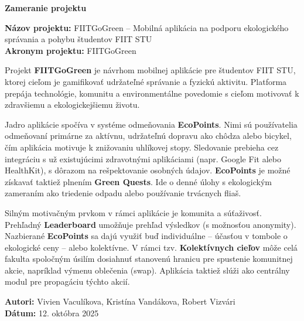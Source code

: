 \documentclass[12pt,a4paper]{article}
\begin{document}
\begin{center}
	\vspace*{1cm}
	{\LARGE \textbf{Zameranie projektu}}\\[0.5cm]


	\begin{flushleft}
		\textbf{Názov projektu:} FIITGoGreen – Mobilná aplikácia na podporu ekologického správania a pohybu študentov FIIT STU \\
		\textbf{Akronym projektu:} FIITGoGreen
	\end{flushleft}
\end{center}

\vspace{0.5cm}

Projekt \textbf{FIITGoGreen} je návrhom mobilnej aplikácie pre študentov FIIT STU, ktorej cieľom je gamifikovať udržateľné správanie a fyzickú aktivitu. Platforma prepája technológie, komunitu a environmentálne povedomie s cieľom motivovať k zdravšiemu a ekologickejšiemu životu.

Jadro aplikácie spočíva v systéme odmeňovania \textbf{EcoPoints}. Nimi sú používatelia odmeňovaní primárne za aktívnu, udržateľnú dopravu ako chôdza alebo bicykel, čím aplikácia motivuje k znižovaniu uhlíkovej stopy. Sledovanie prebieha cez integráciu s už existujúcimi zdravotnými aplikáciami (napr. Google Fit alebo HealthKit), s dôrazom na rešpektovanie osobných údajov. \textbf{EcoPoints} je možné získavať taktiež plnením \textbf{Green Quests}. Ide o denné úlohy s ekologickým zameraním ako triedenie odpadu alebo používanie trvácnych fliaš.

Silným motivačným prvkom v rámci aplikácie je komunita a súťaživosť. Prehľadný \textbf{Leaderboard} umožňuje prehľad výsledkov (s možnosťou anonymity). Nazbierané \textbf{EcoPoints} sa dajú využiť buď individuálne – účasťou v tombole o ekologické ceny – alebo kolektívne. V rámci tzv. \textbf{Kolektívnych cieľov} môže celá fakulta spoločným úsilím dosiahnuť stanovenú hranicu pre spustenie komunitnej akcie, napríklad výmenu oblečenia (swap). Aplikácia taktiež slúži ako centrálny modul pre propagáciu týchto akcií.

\vfill
\begin{flushright}
	\textbf{Autori:} Vivien Vaculíkova, Kristína Vandákova, Robert Vizvári \\[0.3cm]
	\textbf{Dátum:} 12. októbra 2025
\end{flushright}
\end{document}
